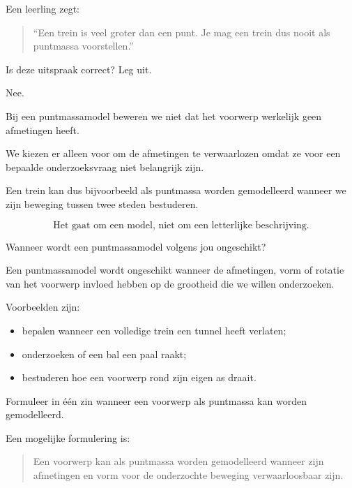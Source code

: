 \documentclass{ximera}
\begin{document}
  \begin{oefening}{\oefG}
  
  Een leerling zegt:
  
  \begin{quote}
  ``Een trein is veel groter dan een punt. Je mag een trein dus nooit als
  puntmassa voorstellen.''
  \end{quote}
  
  \begin{question}
  Is deze uitspraak correct? Leg uit.
  
  \begin{oplossing}
  Nee.
  
  Bij een puntmassamodel beweren we niet dat het voorwerp werkelijk geen
  afmetingen heeft.
  
  We kiezen er alleen voor om de afmetingen te verwaarlozen omdat ze voor een
  bepaalde onderzoeksvraag niet belangrijk zijn.
  
  Een trein kan dus bijvoorbeeld als puntmassa worden gemodelleerd wanneer we
  zijn beweging tussen twee steden bestuderen.
  
  \[
  \boxed{\text{Het gaat om een model, niet om een letterlijke beschrijving.}}
  \]
  \end{oplossing}
  \end{question}
  
  
  \begin{question}
  Wanneer wordt een puntmassamodel volgens jou ongeschikt?
  
  \begin{oplossing}
  Een puntmassamodel wordt ongeschikt wanneer de afmetingen, vorm of rotatie van
  het voorwerp invloed hebben op de grootheid die we willen onderzoeken.
  
  Voorbeelden zijn:
  
  \begin{itemize}
      \item bepalen wanneer een volledige trein een tunnel heeft verlaten;
      \item onderzoeken of een bal een paal raakt;
      \item bestuderen hoe een voorwerp rond zijn eigen as draait.
  \end{itemize}
  \end{oplossing}
  \end{question}
  
  
  \begin{question}
  Formuleer in één zin wanneer een voorwerp als puntmassa kan worden
  gemodelleerd.
  
  \begin{oplossing}
  Een mogelijke formulering is:
  
  \begin{quote}
  Een voorwerp kan als puntmassa worden gemodelleerd wanneer zijn afmetingen en
  vorm voor de onderzochte beweging verwaarloosbaar zijn.
  \end{quote}
  \end{oplossing}
  \end{question}
  
  \end{oefening}
\end{document}
